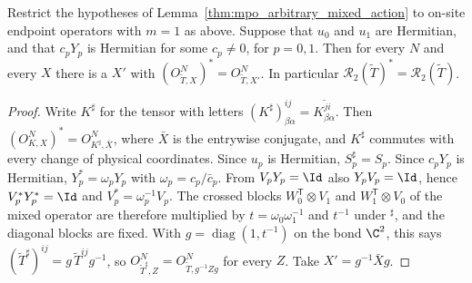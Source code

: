 \begin{lemma}
    \label{thm:mpo_arbitrary_hermitian_gauge_adjoint_closure}
    \leanok
    Restrict the hypotheses of Lemma~\ref{thm:mpo_arbitrary_mixed_action}
    to on-site endpoint operators with $m=1$ as above. Suppose that $u_0$
    and $u_1$ are Hermitian, and that $c_pY_p$ is Hermitian for some
    $c_p\neq0$, for $p=0,1$. Then for every $N$ and every $X$ there is a
    $X'$ with $(O^N_{\widetilde T,X})^*=O^N_{\widetilde T,X'}$. In
    particular $\mathcal R_2(\widetilde T)^*=\mathcal R_2(\widetilde T)$.
\end{lemma}
\begin{proof}
    \leanok
    Write $K^\sharp$ for the tensor with letters
    $(K^\sharp)^{ij}_{\beta\alpha}=\overline{K^{ji}_{\beta\alpha}}$. Then
    $(O^N_{K,X})^*=O^N_{K^\sharp,\bar X}$, where $\bar X$ is the entrywise
    conjugate, and $K^\sharp$ commutes with every change of physical
    coordinates. Since $u_p$ is Hermitian, $S_p^\sharp=S_p$. Since
    $c_pY_p$ is Hermitian, $Y_p^*=\omega_pY_p$ with
    $\omega_p=c_p/\bar c_p$. From $V_pY_p=\Id$ also $Y_pV_p=\Id$, hence
    $V_p^*Y_p^*=\Id$ and $V_p^*=\omega_p^{-1}V_p$. The crossed blocks
    $W_0^{\mathsf T}\otimes V_1$ and $W_1^{\mathsf T}\otimes V_0$ of the
    mixed operator are therefore multiplied by $t=\omega_0\omega_1^{-1}$
    and $t^{-1}$ under ${}^\sharp$, and the diagonal blocks are fixed. With
    $g=\operatorname{diag}(1,t^{-1})$ on the bond $\C^2$, this says
    $(\widetilde T^\sharp)^{ij}=g\,\widetilde T^{ij}g^{-1}$, so
    $O^N_{\widetilde T^\sharp,Z}=O^N_{\widetilde T,g^{-1}Zg}$ for every $Z$.
    Take $X'=g^{-1}\bar Xg$.
\end{proof}

